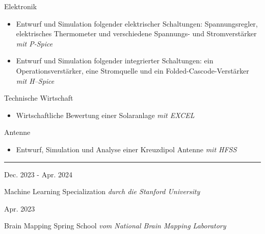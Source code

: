 \documentclass[a4paper,10pt]{article}
\newlength{\cvcolumngapwidth}
\newlength{\cvleftcolumnwidth}
\newlength{\cvrightcolumnwidth}
\newcommand{\cvsectionstyle}[1]{{\normalsize\cvsectionfont\textcolor{cvsectioncolor}{#1}}}
\newcommand{\cvtitlestyle}[1]{{\large\cvtitlefont\textcolor{cvtitlecolor}{#1}}}
\newcommand{\cvdurationstyle}[1]{{\small\cvdurationfont\textcolor{cvdurationcolor}{#1}}}
\newcommand{\cvheadingstyle}[1]{{\normalsize\cvheadingfont\textcolor{cvheadingcolor}{#1}}}
\newlength{\cvafteritemskipamount}
\newlength{\cvaftersectionskipamount}
\newlength{\cvaftertitleskipamount}
\newlength{\cvparskip}
\newcommand{\cvsection}[1]{
    \begin{minipage}[t]{\cvleftcolumnwidth}
        \raggedleft\cvsectionstyle{#1}
    \end{minipage}%
    \hspace{\cvcolumngapwidth}%
    \begin{minipage}[t]{\cvrightcolumnwidth}
        \textcolor{cvrulecolor}{\rule{\cvrightcolumnwidth}{0.3mm}}
    \end{minipage}

    \vspace{\cvaftersectionskipamount}
}
\newcommand{\cvitem}[2]{
    \begin{minipage}[t]{\cvleftcolumnwidth}
        \raggedleft #1
    \end{minipage}%
    \hspace{\cvcolumngapwidth}%
    \begin{minipage}[t]{\cvrightcolumnwidth}
        \setlength{\parskip}{\cvparskip} #2
    \end{minipage}

    \vspace{\cvafteritemskipamount}
}
\newcommand{\cvtitle}[1]{
    \cvtitlestyle{#1}

    \vspace{\cvaftertitleskipamount}
    \vspace{-\cvparskip}
}
\begin{document}
\cvitem{
    \cvheadingstyle{Elektronik}
}{
    \begin{itemize}[leftmargin=*]
        \item Entwurf und Simulation folgender elektrischer Schaltungen: Spannungsregler, elektrisches Thermometer und verschiedene Spannungs- und Stromverstärker \textit{\small{mit P-Spice}}
        \item Entwurf und Simulation folgender integrierter Schaltungen: ein Operationsverstärker, eine Stromquelle und ein Folded-Cascode-Verstärker \textit{\small{mit H–Spice}}
    \end{itemize}
}
\cvitem{
    \cvheadingstyle{Technische Wirtschaft}
}{
    \begin{itemize}[leftmargin=*]
        \item Wirtschaftliche Bewertung einer Solaranlage \textit{\small{mit EXCEL}}
    \end{itemize}
}
\cvitem{
    \cvheadingstyle{Antenne}
}{
    \begin{itemize}[leftmargin=*]
        \item Entwurf, Simulation und Analyse einer Kreuzdipol Antenne \textit{\small{mit HFSS}}
    \end{itemize}
}

\cvsection{ONLINE-KURSE}
\cvitem{
    \cvdurationstyle{Dec. 2023 - Apr. 2024}
}{
    \cvtitle{{Machine Learning Specialization} \textit{\small{durch die Stanford University}}}
}
\vspace{-4mm}
\cvitem{
    \cvdurationstyle{Apr. 2023}
}{
    \cvtitle{{Brain Mapping Spring School} \textit{\small{vom National Brain Mapping Laboratory}}}
}
\end{document}

